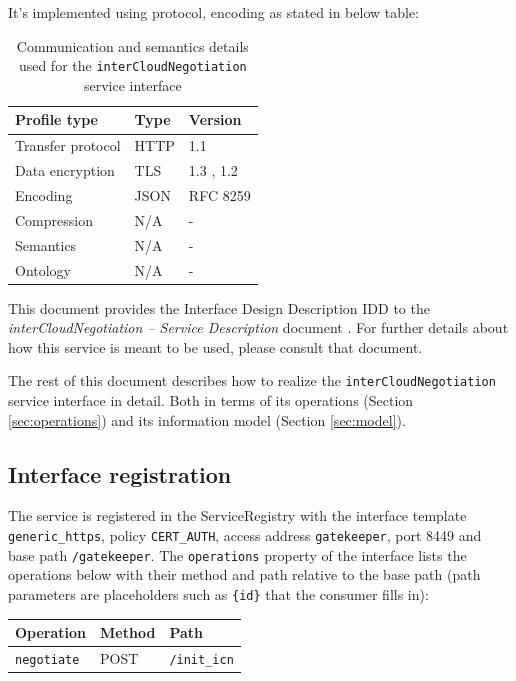 \documentclass[a4paper]{arrowhead}
\begin{document}
It's implemented using protocol, encoding as stated in below table:
\begin{table}[ht!]
  \centering
  \begin{tabular}{|l|l|l|}
    \hline
    \rowcolor{gray!33} Profile type & Type & Version \\ \hline
    Transfer protocol & HTTP & 1.1 \cite{rfc9112} \\ \hline
    Data encryption & TLS & 1.3 \cite{rfc8446}, 1.2 \cite{rfc5246} \\ \hline
    Encoding & JSON & RFC 8259 \cite{rfc8259} \\ \hline
    Compression & N/A & - \\ \hline
    Semantics & N/A & - \\ \hline
    Ontology & N/A & - \\ \hline
  \end{tabular}
  \caption{Communication and semantics details used for the \texttt{inter\allowbreak{}Cloud\allowbreak{}Negotiation} service interface}
  \label{tab:comunication_semantics_profile}
\end{table}

This document provides the Interface Design Description IDD to the \textit{interCloudNegotiation -- Service Description} document \cite{gk-interCloudNegotiation-sd}.
For further details about how this service is meant to be used, please consult that document.

The rest of this document describes how to realize the \texttt{inter\allowbreak{}Cloud\allowbreak{}Negotiation} service
interface in detail. Both in terms of its operations (Section \ref{sec:operations}) and its information model (Section \ref{sec:model}).

\subsection{Interface registration}

The service is registered in the ServiceRegistry with the interface template \texttt{generic\_\allowbreak{}https}, policy \texttt{CERT\_\allowbreak{}AUTH}, access address \texttt{gatekeeper}, port 8449 and base path \texttt{/\allowbreak{}gatekeeper}. The \texttt{operations} property of the interface lists the operations below with their method and path relative to the base path (path parameters are placeholders such as \texttt{\{id\}} that the consumer fills in):

\noindent\begin{longtable}{| p{5.2cm} | p{1.6cm} | p{8.4cm} |} \hline
\rowcolor{gray!33} Operation & Method & Path \\ \hline \endhead
\texttt{negotiate} & POST & \texttt{/\allowbreak{}init\_\allowbreak{}icn} \\ \hline
\end{longtable}
\end{document}
